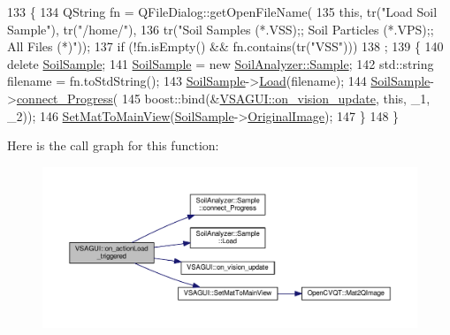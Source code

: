 \begin{DoxyCode}
133                                      \{
134   QString fn = QFileDialog::getOpenFileName(
135       \textcolor{keyword}{this}, tr(\textcolor{stringliteral}{"Load Soil Sample"}), tr(\textcolor{stringliteral}{"/home/"}),
136       tr(\textcolor{stringliteral}{"Soil Samples (*.VSS);; Soil Particles (*.VPS);; All Files (*)"}));
137   \textcolor{keywordflow}{if} (!fn.isEmpty() && fn.contains(tr(\textcolor{stringliteral}{"VSS"})))
138     ;
139   \{
140     \textcolor{keyword}{delete} \hyperlink{class_v_s_a_g_u_i_ac90517c9baea0a75455d43d5eb77d3e7}{SoilSample};
141     \hyperlink{class_v_s_a_g_u_i_ac90517c9baea0a75455d43d5eb77d3e7}{SoilSample} = \textcolor{keyword}{new} \hyperlink{class_soil_analyzer_1_1_sample}{SoilAnalyzer::Sample};
142     std::string filename = fn.toStdString();
143     \hyperlink{class_v_s_a_g_u_i_ac90517c9baea0a75455d43d5eb77d3e7}{SoilSample}->\hyperlink{class_soil_analyzer_1_1_sample_a88f29d8ee3fad37cdad6cb88b2c8a288}{Load}(filename);
144     \hyperlink{class_v_s_a_g_u_i_ac90517c9baea0a75455d43d5eb77d3e7}{SoilSample}->\hyperlink{class_soil_analyzer_1_1_sample_a472dfdde346375463c979e45eb75fbb7}{connect\_Progress}(
145         boost::bind(&\hyperlink{class_v_s_a_g_u_i_a8a5092f741e17c73b04850a6b30dda04}{VSAGUI::on\_vision\_update}, \textcolor{keyword}{this}, \_1, \_2));
146     \hyperlink{class_v_s_a_g_u_i_a988508cf880e27fcd8a029b94e546bcc}{SetMatToMainView}(\hyperlink{class_v_s_a_g_u_i_ac90517c9baea0a75455d43d5eb77d3e7}{SoilSample}->\hyperlink{class_soil_analyzer_1_1_sample_a0d6e6fca9e232a77329daf0b4b29c634}{OriginalImage});
147   \}
148 \}
\end{DoxyCode}


Here is the call graph for this function\+:\nopagebreak
\begin{figure}[H]
\begin{center}
\leavevmode
\includegraphics[width=350pt]{class_v_s_a_g_u_i_a3a2577bbd366b5c1ffd89a8f605ab9cd_cgraph}
\end{center}
\end{figure}


